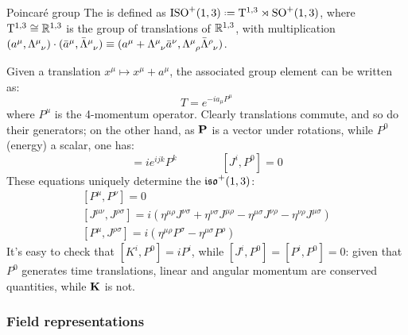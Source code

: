 \begin{definition}{Poincaré group}{}
  The  is defined as $ \pog \defeq \mathrm{T}^{1,3} \rtimes \lorg $, where $ \mathrm{T}^{1,3} \cong \mathbb{R}^{1,3} $ is the group of translations of $ \mathbb{R}^{1,3} $, with multiplication $ (a^\mu, \tensor{\Lambda}{^\mu_\nu}) \cdot (\bar{a}^\mu, \tensor{\bar{\Lambda}}{^\mu_\nu}) \equiv (a^\mu + \tensor{\Lambda}{^\mu_\nu} \bar{a}^\nu, \tensor{\Lambda}{^\mu_\rho} \tensor{\bar{\Lambda}}{^\rho_\nu}) $.
\end{definition}

Given a translation $ x^\mu \mapsto x^\mu + a^\mu $, the associated group element can be written as:
\begin{equation}
  T = e^{-i a_\mu P^\mu}
\end{equation}
where $ P^\mu $ is the 4-momentum operator. Clearly translations commute, and so do their generators; on the other hand, as $ \mathbf{P} $ is a vector under rotations, while $ P^0 $ (energy) a scalar, one has:
\begin{equation*}
  [J^i,P^j] = i e^{ijk} P^k
  \qquad \qquad
  [J^i,P^0] = 0
\end{equation*}
These equations uniquely determine the  $ \mathfrak{iso}^+(1,3) $:
\begin{equation}
  \begin{gathered}
    [P^\mu,P^\nu] = 0 \\
    [J^{\mu \nu}, J^{\rho \sigma}] = i \left( \eta^{\mu \rho} J^{\nu \sigma} + \eta^{\nu \sigma} J^{\mu \rho} - \eta^{\mu \sigma} J^{\nu \rho} - \eta^{\nu \rho} J^{\mu \sigma} \right) \\
    [P^\mu,J^{\rho \sigma}] = i \left( \eta^{\mu \rho} P^\sigma - \eta^{\mu \sigma} P^\rho \right)
  \end{gathered}
\end{equation}
It's easy to check that $ [K^i,P^0] = i P^i $, while $ [J^i,P^0] = [P^i,P^0] = 0 $: given that $ P^0 $ generates time translations, linear and angular momentum are conserved quantities, while $ \mathbf{K} $ is not.

\subsubsection{Field representations}

